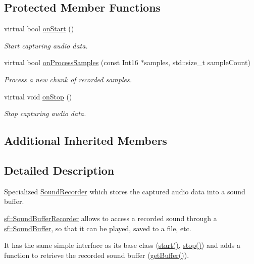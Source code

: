 \subsection*{Protected Member Functions}
\begin{DoxyCompactItemize}
\item 
virtual bool \hyperlink{classsf_1_1_sound_buffer_recorder_a531a7445fc8a48eaf9fc039c83f17c6f}{on\+Start} ()
\begin{DoxyCompactList}\small\item\em Start capturing audio data. \end{DoxyCompactList}\item 
virtual bool \hyperlink{classsf_1_1_sound_buffer_recorder_a9ceb94de14632ae8c1b78faf603b4767}{on\+Process\+Samples} (const Int16 $\ast$samples, std\+::size\+\_\+t sample\+Count)
\begin{DoxyCompactList}\small\item\em Process a new chunk of recorded samples. \end{DoxyCompactList}\item 
\mbox{\label{classsf_1_1_sound_buffer_recorder_ab8e53849312413431873a5869d509f1e}} 
virtual void \hyperlink{classsf_1_1_sound_buffer_recorder_ab8e53849312413431873a5869d509f1e}{on\+Stop} ()
\begin{DoxyCompactList}\small\item\em Stop capturing audio data. \end{DoxyCompactList}\end{DoxyCompactItemize}
\subsection*{Additional Inherited Members}


\subsection{Detailed Description}
Specialized \hyperlink{classsf_1_1_sound_recorder}{Sound\+Recorder} which stores the captured audio data into a sound buffer. 

\hyperlink{classsf_1_1_sound_buffer_recorder}{sf\+::\+Sound\+Buffer\+Recorder} allows to access a recorded sound through a \hyperlink{classsf_1_1_sound_buffer}{sf\+::\+Sound\+Buffer}, so that it can be played, saved to a file, etc.

It has the same simple interface as its base class (\hyperlink{classsf_1_1_sound_recorder_a715f0fd2f228c83d79aaedca562ae51f}{start()}, \hyperlink{classsf_1_1_sound_recorder_a8d9c8346aa9aa409cfed4a1101159c4c}{stop()}) and adds a function to retrieve the recorded sound buffer (\hyperlink{classsf_1_1_sound_buffer_recorder_aa3a8d7a612cb885ed2f58bb86aa24acb}{get\+Buffer()}).

